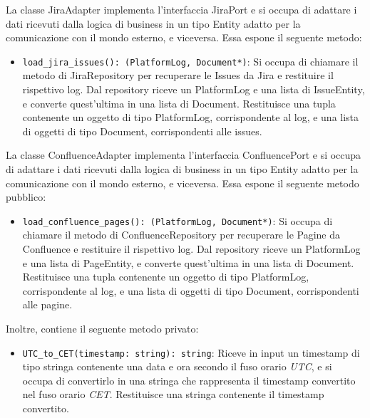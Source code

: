 \label{sec:jira_adapter}
La classe JiraAdapter implementa l'interfaccia JiraPort e si occupa di adattare i dati ricevuti dalla logica di business in un tipo Entity adatto per la comunicazione con il mondo esterno, e viceversa. Essa espone il seguente metodo:
\begin{itemize}
    \item \texttt{load\_jira\_issues(): (PlatformLog, Document*)}: Si occupa di chiamare il metodo di JiraRepository per recuperare le Issues da Jira e restituire il rispettivo log. Dal repository riceve un PlatformLog e una lista di IssueEntity, e converte quest'ultima in una lista di Document. Restituisce una tupla contenente un oggetto di tipo PlatformLog, corrispondente al log, e una lista di oggetti di tipo Document, corrispondenti alle issues.
\end{itemize}

\label{sec:confluence_adapter}
La classe ConfluenceAdapter implementa l'interfaccia ConfluencePort e si occupa di adattare i dati ricevuti dalla logica di business in un tipo Entity adatto per la comunicazione con il mondo esterno, e viceversa. Essa espone il seguente metodo pubblico:
\begin{itemize}
    \item \texttt{load\_confluence\_pages(): (PlatformLog, Document*)}: Si occupa di chiamare il metodo di ConfluenceRepository per recuperare le Pagine da Confluence e restituire il rispettivo log. Dal repository riceve un PlatformLog e una lista di PageEntity, e converte quest'ultima in una lista di Document. Restituisce una tupla contenente un oggetto di tipo PlatformLog, corrispondente al log, e una lista di oggetti di tipo Document, corrispondenti alle pagine.
\end{itemize}
Inoltre, contiene il seguente metodo privato:
\begin{itemize}
    \item \texttt{UTC\_to\_CET(timestamp: string): string}: Riceve in input un timestamp di tipo stringa contenente una data e ora secondo il fuso orario \emph{UTC}, e si occupa di convertirlo in una stringa che rappresenta il timestamp convertito nel fuso orario \emph{CET}. Restituisce una stringa contenente il timestamp convertito.
\end{itemize}

